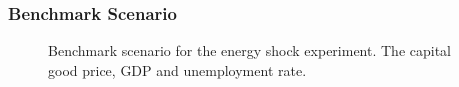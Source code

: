 \begin{comment}
\documentclass{article}
\usepackage{epsfig,graphicx,verbatim, boxedminipage, url}

This version: October 12, 2009\\
Model used: EURACE Integrated Model, rev 2800, October 10, 2009\\
\end{comment}

\subsubsection*{Benchmark Scenario}
\begin{figure}[ht!]
\centering\leavevmode
\begin{minipage}{16cm}
\centering\leavevmode
\end{minipage}
\caption{Benchmark scenario for the energy shock experiment. The capital good price, GDP and unemployment rate.}
\label{Figure: benchmark}
\end{figure}

%

%
\begin{comment}


%
\pagebreak



%
\pagebreak



%
\pagebreak
\end{comment}

